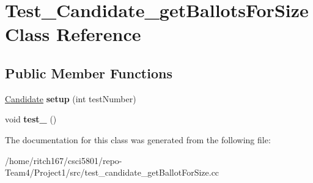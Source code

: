 \hypertarget{classTest__Candidate__getBallotsForSize}{}\section{Test\+\_\+\+Candidate\+\_\+get\+Ballots\+For\+Size Class Reference}
\label{classTest__Candidate__getBallotsForSize}
\subsection*{Public Member Functions}
\begin{DoxyCompactItemize}
\item 
\mbox{\label{classTest__Candidate__getBallotsForSize_a126e569dddb284197de8b542dc47a8ca}} 
\hyperlink{classCandidate}{Candidate} {\bfseries setup} (int test\+Number)
\item 
\mbox{\label{classTest__Candidate__getBallotsForSize_a479975e73832a7a14165677a41ba104c}} 
void {\bfseries test\+\_} ()
\end{DoxyCompactItemize}


The documentation for this class was generated from the following file\+:\begin{DoxyCompactItemize}
\item 
/home/ritch167/csci5801/repo-\/\+Team4/\+Project1/src/test\+\_\+candidate\+\_\+get\+Ballot\+For\+Size.\+cc\end{DoxyCompactItemize}
